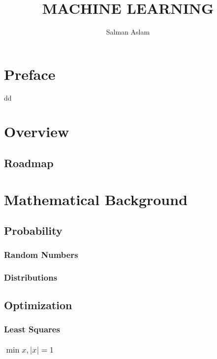 \documentclass{book}
\title{MACHINE LEARNING}
\author{Salman Aslam}
\date{}
\begin{document}
\maketitle

\chapter*{Preface}

dd

\tableofcontents



\chapter{Overview}
\section{Roadmap}




\chapter{Mathematical Background}
\section{Probability}
\subsection{Random Numbers}
\subsection{Distributions}
\section{Optimization}
\subsection{Least Squares}
\subsection{$\min x, |x|=1$}
\end{document}

